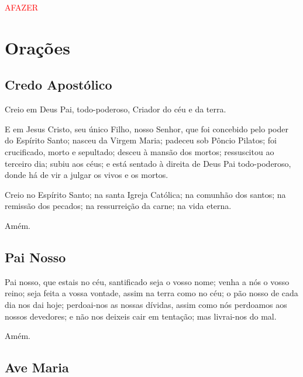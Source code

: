 \documentclass[10pt,a5paper]{book}
\newcommand{\TODO}{\textcolor{red}{\ttfamily AFAZER}}
\begin{document}
\begin{center}
    
\end{center}

\TODO


\chapter{Orações}


\section{Credo Apostólico}

Creio em Deus Pai, todo-poderoso, Criador do céu e da terra.

E em Jesus Cristo, seu único Filho, nosso Senhor,
que foi concebido pelo poder do Espírito Santo;
nasceu da Virgem Maria;
padeceu sob Pôncio Pilatos;
foi crucificado, morto e sepultado;
desceu à mansão dos mortos;
ressuscitou ao terceiro dia;
subiu aos céus;
e está sentado à direita de Deus Pai todo-poderoso,
donde há de vir a julgar os vivos e os mortos.

Creio no Espírito Santo;
na santa Igreja Católica;
na comunhão dos santos;
na remissão dos pecados;
na ressurreição da carne;
na vida eterna.

Amém.


\section{Pai Nosso}

Pai nosso, que estais no céu,
santificado seja o vosso nome;
venha a nós o vosso reino;
seja feita a vossa vontade, assim na terra como no céu;
o pão nosso de cada dia nos dai hoje;
perdoai-nos as nossas dívidas, assim como nós perdoamos aos nossos devedores;
e não nos deixeis cair em tentação;
mas livrai-nos do mal.

Amém.


\section{Ave Maria}
\end{document}
